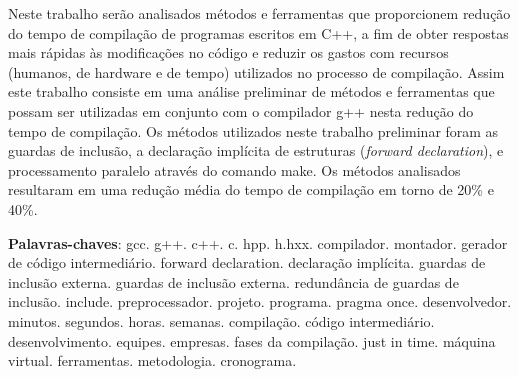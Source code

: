 \begin{resumo}
Neste trabalho serão analisados métodos e ferramentas
 que proporcionem redução do tempo de compilação
 de programas escritos em C++, a fim de obter respostas mais
 rápidas às modificações no código e reduzir os gastos com recursos
 (humanos, de hardware e de tempo) utilizados no processo
 de compilação. Assim este trabalho consiste em uma
 análise preliminar de métodos e ferramentas que possam
 ser utilizadas em conjunto com o compilador g++ 
 nesta redução do tempo de compilação. Os métodos utilizados
 neste trabalho preliminar foram as guardas de inclusão,
 a declaração implícita de estruturas (\textit{forward declaration}),
 e processamento paralelo através do comando make.
 Os métodos analisados resultaram em uma redução média 
 do tempo de compilação em torno de 20\% e 40\%.

 \vspace{\onelineskip}
    
 \noindent
 \textbf{Palavras-chaves}: gcc. g++. c++. c. hpp. h.hxx. compilador. montador. gerador de código intermediário. forward declaration. declaração implícita.  guardas de inclusão externa. guardas de inclusão externa. redundância de guardas de inclusão. include. preprocessador. projeto. programa. pragma once. desenvolvedor. minutos. segundos. horas. semanas. compilação. código intermediário. desenvolvimento. equipes. empresas. fases da compilação. just in time. máquina virtual. ferramentas. metodologia. cronograma.

\end{resumo}
